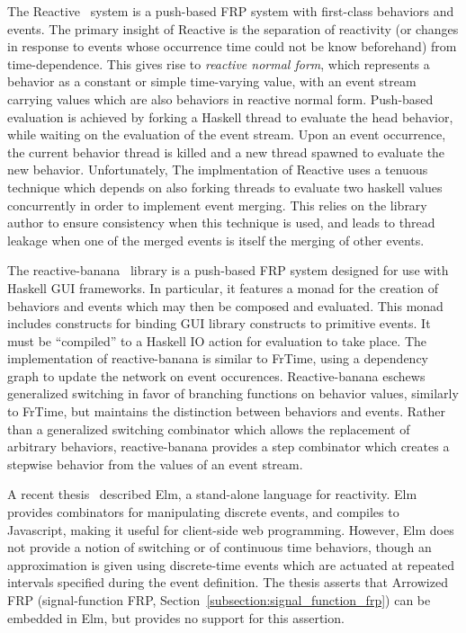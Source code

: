 The Reactive~\cite{Elliott2009} system is a push-based FRP system with first-class behaviors and events. The primary insight of Reactive is
the separation of reactivity (or changes in response to events whose occurrence time could not be know beforehand) from time-dependence. This
gives rise to {\em reactive normal form}, which represents a behavior as a constant or simple time-varying value, with an event stream carrying values
which are also behaviors in reactive normal form. Push-based evaluation is achieved by forking a Haskell thread to evaluate the head behavior,
while waiting on the evaluation of the event stream. Upon an event occurrence, the current behavior thread is killed and a new thread
spawned to evaluate the new behavior. Unfortunately, The implmentation of Reactive uses a tenuous technique which depends on also forking threads to evaluate
two haskell values concurrently in order to implement event merging. This relies on the library author to ensure consistency when this technique is
used, and leads to thread leakage when one of the merged events is itself the merging of other events.

The reactive-banana~\cite{Apfelmus} library is a push-based FRP system designed for use with Haskell GUI frameworks. In particular, it features a monad for
the creation of behaviors and events which may then be composed and evaluated. This monad includes constructs for binding GUI library constructs to primitive events.
It must be ``compiled'' to a Haskell IO action for evaluation to take place. The implementation of reactive-banana is similar to FrTime, using a dependency graph to update the network on event occurences. Reactive-banana eschews generalized switching in favor of branching functions on behavior values, similarly to FrTime, but
maintains the distinction between behaviors and events. Rather than a generalized switching combinator which allows the replacement of arbitrary behaviors,
reactive-banana provides a step combinator which creates a stepwise behavior from the values of an event stream.

A recent thesis~\cite{Czaplicki2012} described Elm, a stand-alone language for reactivity. Elm provides combinators for manipulating discrete events, and
compiles to Javascript, making it useful for client-side web programming. However, Elm does not provide a notion of switching or of continuous time behaviors,
though an approximation is given using discrete-time events which are actuated at repeated intervals specified during the event definition. The thesis asserts
that Arrowized FRP (signal-function FRP, Section~\ref{subsection:signal_function_frp}) can be embedded in Elm, but provides no support for this assertion.

